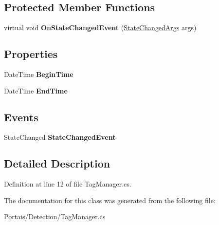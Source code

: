 \subsection*{Protected Member Functions}
\begin{DoxyCompactItemize}
\item 
virtual void {\bfseries On\+State\+Changed\+Event} (\hyperlink{class_portais_1_1_detection_1_1_tag_manager_1_1_state_changed_args}{State\+Changed\+Args} args)\hypertarget{class_portais_1_1_detection_1_1_tag_manager_a4243788335cbed15ab664aaf88cad82b}{}\label{class_portais_1_1_detection_1_1_tag_manager_a4243788335cbed15ab664aaf88cad82b}

\end{DoxyCompactItemize}
\subsection*{Properties}
\begin{DoxyCompactItemize}
\item 
Date\+Time {\bfseries Begin\+Time}\hypertarget{class_portais_1_1_detection_1_1_tag_manager_ad21da593ceb1c3af2e537afde60c309a}{}\label{class_portais_1_1_detection_1_1_tag_manager_ad21da593ceb1c3af2e537afde60c309a}

\item 
Date\+Time {\bfseries End\+Time}\hypertarget{class_portais_1_1_detection_1_1_tag_manager_aa23d9f9b226ad30169f9b03f50086590}{}\label{class_portais_1_1_detection_1_1_tag_manager_aa23d9f9b226ad30169f9b03f50086590}

\end{DoxyCompactItemize}
\subsection*{Events}
\begin{DoxyCompactItemize}
\item 
State\+Changed {\bfseries State\+Changed\+Event}\hypertarget{class_portais_1_1_detection_1_1_tag_manager_a10903b84d56744ae2d62f2da01f36051}{}\label{class_portais_1_1_detection_1_1_tag_manager_a10903b84d56744ae2d62f2da01f36051}

\end{DoxyCompactItemize}


\subsection{Detailed Description}


Definition at line 12 of file Tag\+Manager.\+cs.



The documentation for this class was generated from the following file\+:\begin{DoxyCompactItemize}
\item 
Portais/\+Detection/Tag\+Manager.\+cs\end{DoxyCompactItemize}

